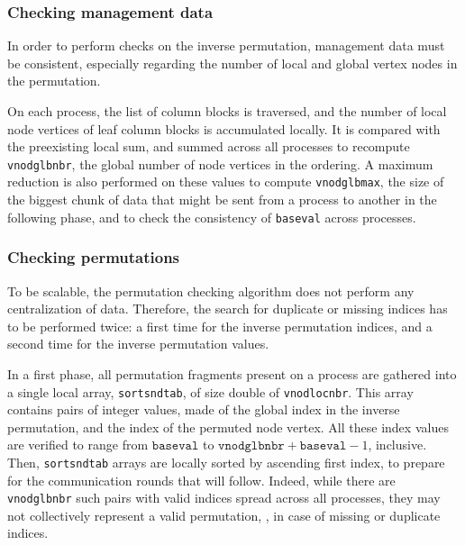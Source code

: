 \subsubsection{Checking management data}

In order to perform checks on the inverse permutation, management data
must be consistent, especially regarding the number of local and
global vertex nodes in the permutation.

On each process, the list of column blocks is traversed, and the
number of local node vertices of leaf column blocks is accumulated
locally. It is compared with the preexisting local sum, and summed
across all processes to recompute \texttt{vnod\lbt glb\lbt nbr}, the
global number of node vertices in the ordering. A maximum reduction is
also performed on these values to compute
\texttt{vnod\lbt glb\lbt max}, the size of the biggest chunk of data
that might be sent from a process to another in the following phase,
and to check the consistency of \texttt{baseval} across processes.

\subsubsection{Checking permutations}

To be scalable, the permutation checking algorithm does not perform
any centralization of data. Therefore, the search for duplicate or
missing indices has to be performed twice: a first time for the
inverse permutation indices, and a second time for the inverse
permutation values.

In a first phase, all permutation fragments present on a process are
gathered into a single local array, \texttt{sort\lbt snd\lbt tab}, of
size double of \texttt{vnod\lbt loc\lbt nbr}.
This array contains pairs of integer values, made of the global index
in the inverse permutation, and the index of the permuted node
vertex. All these index values are verified to range from
$\mathtt{baseval}$ to $\mathtt{vnodglbnbr} + \mathtt{baseval} - 1$,
inclusive. Then, \texttt{sort\lbt snd\lbt tab} arrays are locally
sorted by ascending first index, to prepare for the communication
rounds that will follow. Indeed, while there are
\texttt{vnod\lbt glb\lbt nbr} such pairs with valid indices spread
across all processes, they may not collectively represent a valid
permutation, \eg, in case of missing or duplicate indices. 

